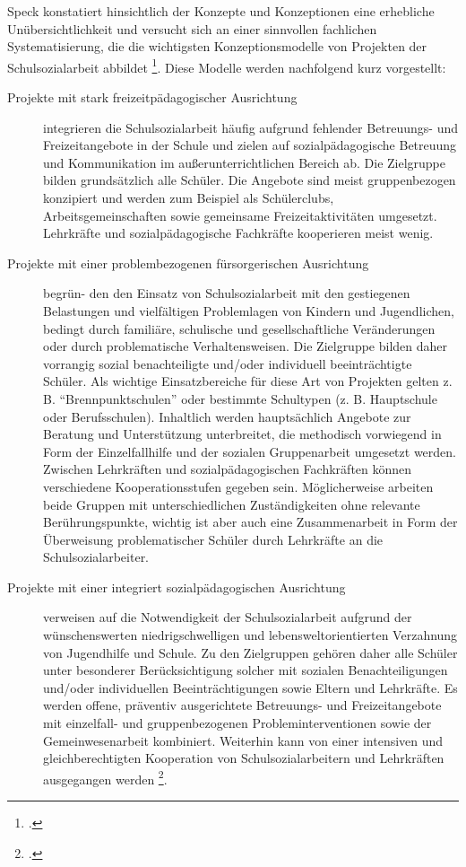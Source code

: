 Speck konstatiert hinsichtlich der Konzepte und Konzeptionen eine erhebliche Unübersichtlichkeit und versucht sich an einer sinnvollen fachlichen Systematisierung, die die wichtigsten Konzeptionsmodelle von Projekten der Schulsozialarbeit abbildet \footcite[vgl.][25f]{Speck2006}. Diese Modelle werden nachfolgend kurz vorgestellt:
\begin{description}
	\item[Projekte mit stark freizeitpädagogischer Ausrichtung] integrieren die Schulsozialarbeit häufig aufgrund fehlender Betreuungs- und Freizeitangebote in der Schule und zielen auf sozialpädagogische Betreuung und Kommunikation im außerunterrichtlichen Bereich ab. Die Zielgruppe bilden grundsätzlich alle Schüler. Die Angebote sind meist gruppenbezogen konzipiert und werden zum Beispiel als Schülerclubs, Arbeitsgemeinschaften sowie gemeinsame Freizeitaktivitäten umgesetzt. Lehrkräfte und sozialpädagogische Fachkräfte kooperieren meist wenig. 
	\item[Projekte mit einer problembezogenen fürsorgerischen Ausrichtung] begrün- den den Einsatz von Schulsozialarbeit mit den gestiegenen Belastungen und vielfältigen Problemlagen von Kindern und Jugendlichen, bedingt durch familiäre, schulische und gesellschaftliche Veränderungen oder durch problematische Verhaltensweisen. Die Zielgruppe bilden daher vorrangig sozial benachteiligte und/oder individuell beeinträchtigte Schüler. Als wichtige Einsatzbereiche für diese Art von Projekten gelten z. B. "`Brennpunktschulen"' oder bestimmte Schultypen (z. B. Hauptschule oder Berufsschulen). Inhaltlich werden hauptsächlich Angebote zur Beratung und Unterstützung unterbreitet, die methodisch vorwiegend in Form der Einzelfallhilfe und der sozialen Gruppenarbeit umgesetzt werden. Zwischen Lehrkräften und sozialpädagogischen Fachkräften können verschiedene Kooperationsstufen gegeben sein. Möglicherweise arbeiten beide Gruppen mit unterschiedlichen Zuständigkeiten ohne relevante Berührungspunkte, wichtig ist aber auch eine Zusammenarbeit in Form der Überweisung problematischer Schüler durch Lehrkräfte an die Schulsozialarbeiter.
	\item[Projekte mit einer integriert sozialpädagogischen Ausrichtung] verweisen auf die Notwendigkeit der Schulsozialarbeit aufgrund der wünschenswerten niedrigschwelligen und lebensweltorientierten Verzahnung von Jugendhilfe und Schule. Zu den Zielgruppen gehören daher alle Schüler unter besonderer Berücksichtigung solcher mit sozialen Benachteiligungen und/oder individuellen Beeinträchtigungen sowie Eltern und Lehrkräfte. Es werden offene, präventiv ausgerichtete Betreuungs- und Freizeitangebote mit einzelfall- und gruppenbezogenen Probleminterventionen sowie der Gemeinwesenarbeit kombiniert. Weiterhin kann von einer intensiven und gleichberechtigten Kooperation von Schulsozialarbeitern und Lehrkräften ausgegangen werden \footcite[vgl.][25f]{Speck2006}.
\end{description}

